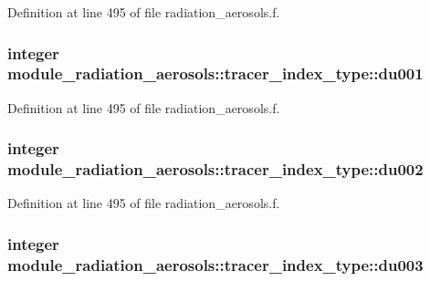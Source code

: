 Definition at line 495 of file radiation\+\_\+aerosols.\+f.

\subsubsection[{\texorpdfstring{du001}{du001}}]{\setlength{\rightskip}{0pt plus 5cm}integer module\+\_\+radiation\+\_\+aerosols\+::tracer\+\_\+index\+\_\+type\+::du001\hspace{0.3cm}{\ttfamily [private]}}\hypertarget{structmodule__radiation__aerosols_1_1tracer__index__type_af4355efd112704adbaeab5a3fd1d7912}{}\label{structmodule__radiation__aerosols_1_1tracer__index__type_af4355efd112704adbaeab5a3fd1d7912}


Definition at line 495 of file radiation\+\_\+aerosols.\+f.

\subsubsection[{\texorpdfstring{du002}{du002}}]{\setlength{\rightskip}{0pt plus 5cm}integer module\+\_\+radiation\+\_\+aerosols\+::tracer\+\_\+index\+\_\+type\+::du002\hspace{0.3cm}{\ttfamily [private]}}\hypertarget{structmodule__radiation__aerosols_1_1tracer__index__type_ab68920703fa2cda7cbc42cb568a2ed56}{}\label{structmodule__radiation__aerosols_1_1tracer__index__type_ab68920703fa2cda7cbc42cb568a2ed56}


Definition at line 495 of file radiation\+\_\+aerosols.\+f.

\subsubsection[{\texorpdfstring{du003}{du003}}]{\setlength{\rightskip}{0pt plus 5cm}integer module\+\_\+radiation\+\_\+aerosols\+::tracer\+\_\+index\+\_\+type\+::du003\hspace{0.3cm}{\ttfamily [private]}}\hypertarget{structmodule__radiation__aerosols_1_1tracer__index__type_a9b2422518e2c8aaba9f0b64bd0c4676a}{}\label{structmodule__radiation__aerosols_1_1tracer__index__type_a9b2422518e2c8aaba9f0b64bd0c4676a}


